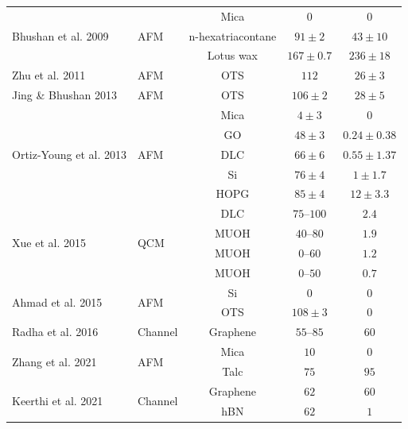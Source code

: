\documentclass[journal=jacsat,manuscript=article]{achemso}
\begin{document}
\begin{table}[p]
{{\begin{tabular}{llccc}
\multirow{3}{*}{Bhushan et al. 2009\cite{Bhushan2009-yz}} & \multirow{3}{*}{AFM} & Mica & $0$ & $0$ \\
 &  & n-hexatriacontane & $91 \pm 2$ & $43 \pm 10$ \\
 &  & Lotus wax & $167 \pm 0.7$ & $236 \pm 18$ \\
\cline{1-5}

Zhu et al. 2011\cite{Zhu2011-je} & AFM & OTS & $112$ & $26 \pm 3$ \\
\cline{1-5}

Jing \& Bhushan 2013\cite{Jing2013-kn} & AFM & OTS & $106 \pm 2$ & $28 \pm 5$ \\
\cline{1-5}

\multirow{5}{*}{Ortiz-Young et al. 2013\cite{Ortiz-Young2013-wc}} & \multirow{5}{*}{AFM} & Mica & $4 \pm 3$ & $0$ \\
 &  & GO & $48 \pm 3$ & $0.24 \pm 0.38$ \\
 &  & DLC & $66 \pm 6$ & $0.55 \pm 1.37$ \\
 &  & Si & $76 \pm 4$ & $1 \pm 1.7$ \\
 &  & HOPG & $85 \pm 4$ & $12 \pm 3.3$ \\
\cline{1-5}

\multirow{4}{*}{Xue et al. 2015\cite{Xue2015-tu}} & \multirow{4}{*}{QCM} & DLC & $75$--$100$ & $2.4$ \\
 &  & MUOH & $40$--$80$ & $1.9$ \\
 &  & MUOH & $0$--$60$ & $1.2$ \\
 &  & MUOH & $0$--$50$ & $0.7$ \\
\cline{1-5}

\multirow{2}{*}{Ahmad et al. 2015\cite{Ahmad2015-eb}} & \multirow{2}{*}{AFM} & Si & $0$ & $0$ \\
 &  & OTS & $108 \pm 3$ & $0$ \\
\cline{1-5}

Radha et al. 2016\cite{Radha2016-bk} & Channel & Graphene & $55$--$85$ & $60$ \\
\cline{1-5}

\multirow{2}{*}{Zhang et al. 2021\cite{Zhang2021-tn}} & \multirow{2}{*}{AFM} & Mica & $10$ & $0$ \\
 &  & Talc & $75$ & $95$ \\
\cline{1-5}

\multirow{2}{*}{Keerthi et al. 2021\cite{Keerthi2021-mz}} & \multirow{2}{*}{Channel} & Graphene & $62$ & $60$ \\
 &  & hBN & $62$ & $1$ \\
\cline{1-5}


\end{tabular}}}
\end{table}
\end{document}
